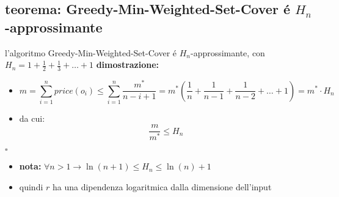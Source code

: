 
\subsection*{teorema: Greedy-Min-Weighted-Set-Cover \'e $H_n$-approssimante}
\begin{flushleft}
	l'algoritmo Greedy-Min-Weighted-Set-Cover \'e $H_n$-approssimante, con
	$H_n=1+\frac{1}{2}+\frac{1}{3}+\ldots+1$
	\textbf{dimostrazione:}
	\begin{itemize}
		\item[] $$m=\sum_{i=1}^nprice(o_i)\leq\sum_{i=1}^n\frac{m^*}{n-i+1}=m^*(\frac{1}{n}+\frac{1}{n-1}+\frac{1}{n-2}+\ldots+1)=m^*\cdot H_n$$
		\item da cui:
			$$\frac{m}{m^*}\leq H_n$$
	\end{itemize}
	\hfill$\square$
	\begin{itemize}
		\item \textbf{nota:} $\forall n>1\rightarrow \ln(n+1)\leq H_n\leq\ln(n)+1$
		\item quindi $r$ ha una dipendenza logaritmica dalla dimensione dell'input
	\end{itemize}
\end{flushleft}


